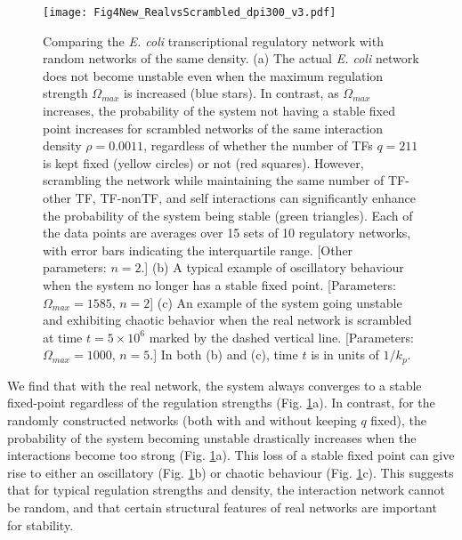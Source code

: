 \documentclass[10pt]{article}
\begin{document}
\begin{figure}[!ht]
    \centering
	\texttt{[image: Fig4New\_RealvsScrambled\_dpi300\_v3.pdf]}
    \caption{Comparing the \textit{E. coli} transcriptional regulatory network with random networks of the same density. (a) The actual \textit{E. coli} network does not become unstable even when the maximum regulation strength $\Omega_{max}$ is increased (blue stars). In contrast, as $\Omega_{max}$ increases, the probability of the system not having a stable fixed point increases for scrambled networks of the same interaction density $\rho = 0.0011$, regardless of whether the number of TFs $q = 211$ is kept fixed (yellow circles) or not (red squares). However, scrambling the network while maintaining the same number of TF-other TF, TF-nonTF, and self interactions can significantly enhance the probability of the system being stable (green triangles). Each of the data points are averages over 15 sets of 10 regulatory networks, with error bars indicating the interquartile range. [Other parameters: $n=2$.] (b) A typical example of oscillatory behaviour when the system no longer has a stable fixed point. [Parameters: $\Omega_{max} = 1585$, $n=2$] (c) An example of the system going unstable and exhibiting chaotic behavior when the real network is scrambled at time $t = 5 \times 10^6$ marked by the dashed vertical line. [Parameters: $\Omega_{max} = 1000$, $n=5$.] In both (b) and (c), time $t$ is in units of $1/k_p$.}
    \label{fig:realVscrambled}
\end{figure}

We find that with the real network, the system always converges to a stable fixed-point regardless of the regulation strengths (Fig. \ref{fig:realVscrambled}a). In contrast, for the randomly constructed networks (both with and without keeping $q$ fixed), the probability of the system becoming unstable drastically increases when the interactions become too strong (Fig. \ref{fig:realVscrambled}a). This loss of a stable fixed point can give rise to either an oscillatory (Fig. \ref{fig:realVscrambled}b) or chaotic behaviour (Fig. \ref{fig:realVscrambled}c). This suggests that for typical regulation strengths and density, the interaction network cannot be random, and that certain structural features of real networks are important for stability. 

\end{document}
